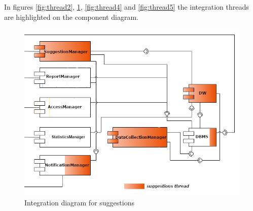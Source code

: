 \documentclass[a4paper]{report}
\begin{document}
In figures \ref{fig:thread2}, \ref{fig:thread3}, \ref{fig:thread4} and \ref{fig:thread5} the integration threads are highlighted on the component diagram.
\begin{figure}[htp]
\centering
\includegraphics[scale=2]{Thread3}
\caption{Integration diagram for suggestions}
\label{fig:thread3}
\end{figure}
\end{document}
